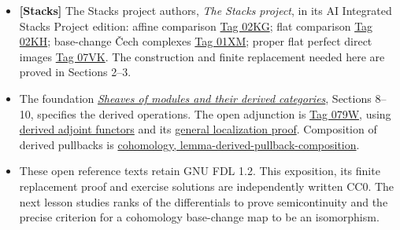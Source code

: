 \documentclass[11pt]{article}
\providecommand{\tightlist}{\setlength{\itemsep}{0pt}\setlength{\parskip}{0pt}}
\begin{document}
\begin{itemize}
\tightlist
\item
  \textbf{{[}Stacks{]}} The Stacks project authors, \emph{The Stacks
  project}, in its AI Integrated Stacks Project edition: affine
  comparison
  \href{https://kokunoyumeto.github.io/stacks-zh-hans-cn/en/coherent.html\#coherent-lemma-affine-base-change}{Tag
  02KG}; flat comparison
  \href{https://kokunoyumeto.github.io/stacks-zh-hans-cn/en/coherent.html\#coherent-lemma-flat-base-change-cohomology}{Tag
  02KH}; base-change Čech complexes
  \href{https://kokunoyumeto.github.io/stacks-zh-hans-cn/en/coherent.html\#coherent-lemma-base-change-complex}{Tag
  01XM}; proper flat perfect direct images
  \href{https://kokunoyumeto.github.io/stacks-zh-hans-cn/en/coherent.html\#coherent-lemma-perfect-direct-image}{Tag
  07VK}. The construction and finite replacement needed here are proved
  in Sections 2--3.
\item
  The foundation
  \emph{\href{https://kokunoyumeto.github.io/open-math-courses/courses/derived-categories-and-sheaf-operations/injective-modules-and-bounded-below-derived-functors.html}{Sheaves
  of modules and their derived categories}}, Sections 8--10, specifies
  the derived operations. The open adjunction is
  \href{https://kokunoyumeto.github.io/stacks-zh-hans-cn/en/cohomology.html\#cohomology-lemma-adjoint}{Tag
  079W}, using
  \href{https://kokunoyumeto.github.io/stacks-zh-hans-cn/en/derived.html\#derived-lemma-derived-adjoint-functors}{derived
  adjoint functors} and its
  \href{https://kokunoyumeto.github.io/stacks-zh-hans-cn/en/derived.html\#derived-lemma-pre-derived-adjoint-functors-general}{general
  localization proof}. Composition of derived pullbacks is
  \href{https://kokunoyumeto.github.io/stacks-zh-hans-cn/en/cohomology.html\#cohomology-lemma-derived-pullback-composition}{cohomology,
  lemma-derived-pullback-composition}.
\item
  These open reference texts retain GNU FDL 1.2. This exposition, its
  finite replacement proof and exercise solutions are independently
  written CC0. The next lesson studies ranks of the differentials to
  prove semicontinuity and the precise criterion for a cohomology
  base-change map to be an isomorphism.
\end{itemize}
\end{document}
